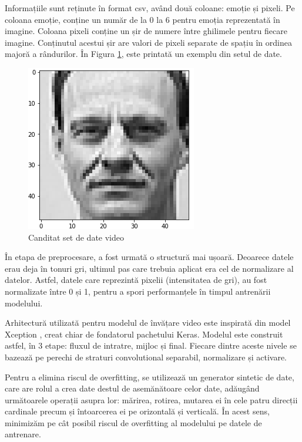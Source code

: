 \documentclass[a4paper, 12pt]{report}
\begin{document}
	Informațiile sunt reținute în format csv, având două coloane: emoție și pixeli. Pe coloana emoție, conține un număr de la 0 la 6 pentru emoția reprezentată în imagine. Coloana pixeli conține un șir de numere între ghilimele pentru fiecare imagine. Conținutul acestui șir are valori de pixeli separate de spațiu în ordinea majoră a rândurilor. În Figura \ref{fig:video_dataset_example}, este printată un exemplu din setul de date.
	
	\begin{figure}[H]
		\begin{center} 
			\includegraphics[scale=0.7]{images/video_dataset_example.png}
		\end{center}
		\caption{Canditat set de date video}
		\label{fig:video_dataset_example}
	\end{figure}
	
	În etapa de preprocesare, a fost urmată o structură mai ușoară. Deoarece datele erau deja în tonuri gri, ultimul pas care trebuia aplicat era cel de normalizare al datelor. Astfel, datele care reprezintă pixelii (intensitatea de gri), au fost normalizate între 0 și 1, pentru a spori performanțele în timpul antrenării modelului.
	
	Arhitectură utilizată pentru modelul de învățare video este inspirată din model Xception \cite{xception}, creat chiar de fondatorul pachetului Keras. Modelul este construit astfel, în 3 etape: fluxul de intratre, mijloc și final. Fiecare dintre aceste nivele se bazează pe perechi de straturi convolutional separabil, normalizare și activare. 
	
	Pentru a elimina riscul de overfitting, se utilizează un generator sintetic de date, care are rolul a crea date destul de asemănătoare celor date, adăugând următoarele operații asupra lor: mărirea, rotirea, mutarea ei în cele patru direcții cardinale precum și întoarcerea ei pe orizontală și verticală. În acest sens, minimizăm pe cât posibil riscul de overfitting al modelului pe datele de antrenare.
	
\end{document}
